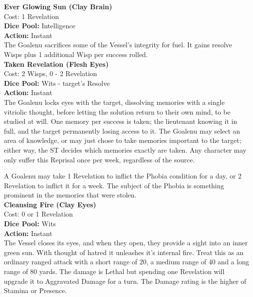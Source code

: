 \noindent\textbf{Ever Glowing Sun (Clay Brain)} \\

\noindent Cost: 1 Revelation\\

\noindent\textbf{Dice Pool:} Intelligence\\

\noindent\textbf{Action:} Instant\\

\noindent The Goalenu sacrifices some of the Vessel's integrity for fuel. It gains resolve Wisps plus 1 additional Wisp per success rolled.\\

\noindent\textbf{Taken Revelation (Flesh Eyes)}\\

\noindent Cost: 2 Wisps, 0 - 2 Revelation\\

\noindent\textbf{Dice Pool:} Wits - target's Resolve\\

\noindent\textbf{Action:} Instant\\

\noindent The Goalenu locks eyes with the target, dissolving memories with a single vitriolic thought, before letting the solution return to their own mind, to be studied at will. One memory per success is taken; the lieutenant knowing it in full, and the target permanently losing access to it. The Goalenu may select an area of knowledge, or may just chose to take memories important to the target; either way, the ST decides which memories exactly are taken. Any character may only suffer this Reprisal once per week, regardless of the source.

A Goalenu may take 1 Revelation to inflict the Phobia condition for a day, or 2 Revelation to inflict it for a week. The subject of the Phobia is something prominent in the memories that were stolen.\\

\noindent\textbf{Cleansing Fire (Clay Eyes)}\\

\noindent Cost: 0 or 1 Revelation\\

\noindent\textbf{Dice Pool:} Wits\\

\noindent\textbf{Action:} Instant \\

\noindent The Vessel closes its eyes, and when they open, they provide a sight into an inner green sun. With thought of hatred it unleashes it's internal fire. Treat this as an ordinary ranged attack with a short range of 20, a medium range of 40 and a long range of 80 yards. The damage is Lethal but spending one Revelation will upgrade it to Aggravated Damage for a turn. The Damage rating is the higher of Stamina or Presence. \\

